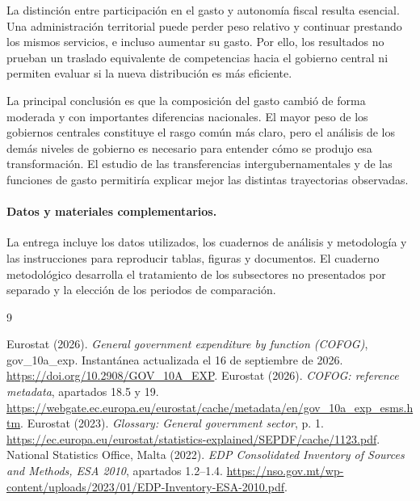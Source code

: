 \documentclass[11pt,a4paper]{article}
\begin{document}
La distinción entre participación en el gasto y autonomía fiscal resulta esencial. Una administración territorial puede perder peso relativo y continuar prestando los mismos servicios, e incluso aumentar su gasto. Por ello, los resultados no prueban un traslado equivalente de competencias hacia el gobierno central ni permiten evaluar si la nueva distribución es más eficiente.

La principal conclusión es que la composición del gasto cambió de forma moderada y con importantes diferencias nacionales. El mayor peso de los gobiernos centrales constituye el rasgo común más claro, pero el análisis de los demás niveles de gobierno es necesario para entender cómo se produjo esa transformación. El estudio de las transferencias intergubernamentales y de las funciones de gasto permitiría explicar mejor las distintas trayectorias observadas.

\paragraph{Datos y materiales complementarios.}
La entrega incluye los datos utilizados, los cuadernos de análisis y metodología y las instrucciones para reproducir tablas, figuras y documentos. El cuaderno metodológico desarrolla el tratamiento de los subsectores no presentados por separado y la elección de los periodos de comparación.

\begin{thebibliography}{9}
\small\raggedright
{} Eurostat (2026). \emph{General government expenditure by function (COFOG)}, gov\_10a\_exp. Instantánea actualizada el 16 de septiembre de 2026. \url{https://doi.org/10.2908/GOV_10A_EXP}.
 Eurostat (2026). \emph{COFOG: reference metadata}, apartados 18.5 y 19. \url{https://webgate.ec.europa.eu/eurostat/cache/metadata/en/gov_10a_exp_esms.htm}.
 Eurostat (2023). \emph{Glossary: General government sector}, p. 1. \url{https://ec.europa.eu/eurostat/statistics-explained/SEPDF/cache/1123.pdf}.
 National Statistics Office, Malta (2022). \emph{EDP Consolidated Inventory of Sources and Methods, ESA 2010}, apartados 1.2--1.4. \url{https://nso.gov.mt/wp-content/uploads/2023/01/EDP-Inventory-ESA-2010.pdf}.
\end{thebibliography}

\clearpage
\appendix
\end{document}
